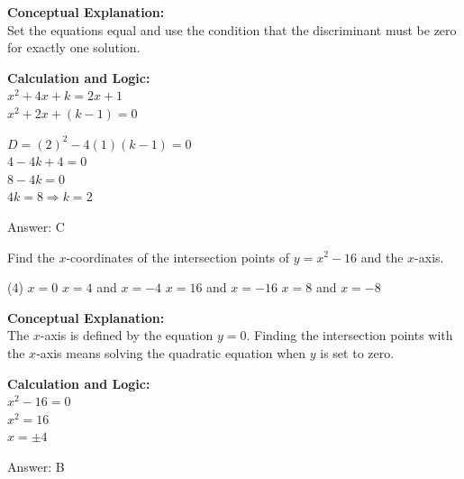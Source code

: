 \documentclass[11pt,paper=a4,answers]{exam}
\begin{document}
\begin{questions}
\begin{solution}
\textbf{Conceptual Explanation:} \\
Set the equations equal and use the condition that the discriminant must be zero for exactly one solution.

\vspace{20pt}

\textbf{Calculation and Logic:} \\
$x^2 + 4x + k = 2x + 1$ \\
$x^2 + 2x + (k - 1) = 0$

\vspace{10pt}

$D = (2)^2 - 4(1)(k - 1) = 0$ \\
$4 - 4k + 4 = 0$ \\
$8 - 4k = 0$ \\
$4k = 8 \Rightarrow k = 2$

\vspace{25pt}

Answer: \colorbox{yellow!100}{C}
\end{solution}

\vspace{40pt}

\question
Find the $x$-coordinates of the intersection points of $y = x^2 - 16$ and the $x$-axis.
\begin{tasks}(4)
    \task $x = 0$
    \task $x = 4$ and $x = -4$
    \task $x = 16$ and $x = -16$
    \task $x = 8$ and $x = -8$
\end{tasks}

\begin{solution}
\textbf{Conceptual Explanation:} \\
The $x$-axis is defined by the equation $y = 0$. Finding the intersection points with the $x$-axis means solving the quadratic equation when $y$ is set to zero.

\vspace{20pt}

\textbf{Calculation and Logic:} \\
$x^2 - 16 = 0$ \\
$x^2 = 16$ \\
$x = \pm 4$

\vspace{25pt}

Answer: \colorbox{yellow!100}{B}
\end{solution}

\vspace{40pt}


\end{questions}
\end{document}
